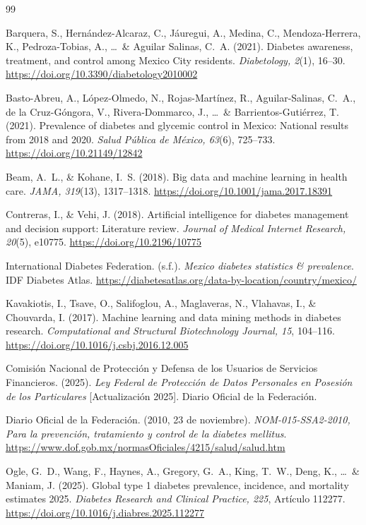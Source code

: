 \documentclass[12pt, letterpaper, twoside]{report}
\begin{document}
\begin{thebibliography}{99}

Barquera, S., Hernández-Alcaraz, C., Jáuregui, A., Medina, C., Mendoza-Herrera, K., Pedroza-Tobias, A., \ldots\ \& Aguilar Salinas, C.~A. (2021). Diabetes awareness, treatment, and control among Mexico City residents. \textit{Diabetology, 2}(1), 16--30. \url{https://doi.org/10.3390/diabetology2010002}

Basto-Abreu, A., López-Olmedo, N., Rojas-Martínez, R., Aguilar-Salinas, C.~A., de la Cruz-Góngora, V., Rivera-Dommarco, J., \ldots\ \& Barrientos-Gutiérrez, T. (2021). Prevalence of diabetes and glycemic control in Mexico: National results from 2018 and 2020. \textit{Salud Pública de México, 63}(6), 725--733. \url{https://doi.org/10.21149/12842}

Beam, A.~L., \& Kohane, I.~S. (2018). Big data and machine learning in health care. \textit{JAMA, 319}(13), 1317--1318. \url{https://doi.org/10.1001/jama.2017.18391}

Contreras, I., \& Vehi, J. (2018). Artificial intelligence for diabetes management and decision support: Literature review. \textit{Journal of Medical Internet Research, 20}(5), e10775. \url{https://doi.org/10.2196/10775}

International Diabetes Federation. (s.f.). \textit{Mexico diabetes statistics \& prevalence}. IDF Diabetes Atlas. \url{https://diabetesatlas.org/data-by-location/country/mexico/}

Kavakiotis, I., Tsave, O., Salifoglou, A., Maglaveras, N., Vlahavas, I., \& Chouvarda, I. (2017). Machine learning and data mining methods in diabetes research. \textit{Computational and Structural Biotechnology Journal, 15}, 104--116. \url{https://doi.org/10.1016/j.csbj.2016.12.005}

Comisión Nacional de Protección y Defensa de los Usuarios de Servicios Financieros. (2025). \textit{Ley Federal de Protección de Datos Personales en Posesión de los Particulares} [Actualización 2025]. Diario Oficial de la Federación.

Diario Oficial de la Federación. (2010, 23 de noviembre). \textit{NOM-015-SSA2-2010, Para la prevención, tratamiento y control de la diabetes mellitus}. \url{https://www.dof.gob.mx/normasOficiales/4215/salud/salud.htm}

Ogle, G.~D., Wang, F., Haynes, A., Gregory, G.~A., King, T.~W., Deng, K., \ldots\ \& Maniam, J. (2025). Global type 1 diabetes prevalence, incidence, and mortality estimates 2025. \textit{Diabetes Research and Clinical Practice, 225}, Artículo 112277. \url{https://doi.org/10.1016/j.diabres.2025.112277}


\end{thebibliography}
\end{document}
